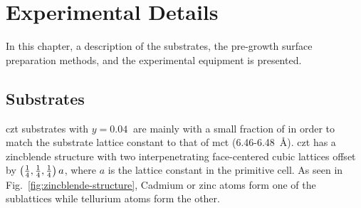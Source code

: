 
\chapter{Experimental Details}\label{ch:exp-details}
In this chapter, a description of the substrates, the pre-growth surface preparation methods, and the experimental equipment is presented.
\section{ Substrates}
\acl{czt} substrates with $y=\SI{0.04}{}$ are mainly  with a small fraction of  in order to match the substrate lattice constant to that of \acl{mct} (\SI{6.46}{}-\SI{6.48}{\angstrom}). \Ac{czt} has a zincblende structure with two interpenetrating face-centered cubic lattices offset by $\left( \frac{1}{4},\frac{1}{4},\frac{1}{4} \right)a$, where $a$ is the lattice constant in the primitive cell. As seen in Fig.~\ref{fig:zincblende-structure}, Cadmium or zinc atoms form one of the sublattices while tellurium atoms form the other.

